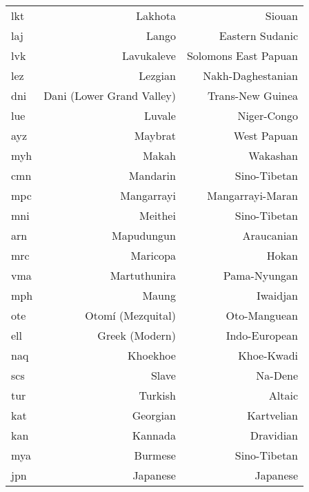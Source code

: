 \begin{longtable}{|l|r|r|}
lkt                & Lakhota                   & Siouan               \\
laj                & Lango                     & Eastern Sudanic      \\
lvk                & Lavukaleve                & Solomons East Papuan \\
lez                & Lezgian                   & Nakh-Daghestanian    \\
dni                & Dani (Lower Grand Valley) & Trans-New Guinea     \\
lue                & Luvale                    & Niger-Congo          \\
ayz                & Maybrat                   & West Papuan          \\
myh                & Makah                     & Wakashan             \\
cmn                & Mandarin                  & Sino-Tibetan         \\
mpc                & Mangarrayi                & Mangarrayi-Maran     \\
mni                & Meithei                   & Sino-Tibetan         \\
arn                & Mapudungun                & Araucanian           \\
mrc                & Maricopa                  & Hokan                \\
vma                & Martuthunira              & Pama-Nyungan         \\
mph                & Maung                     & Iwaidjan             \\
ote                & Otomí (Mezquital)         & Oto-Manguean         \\
ell                & Greek (Modern)            & Indo-European        \\
naq                & Khoekhoe                  & Khoe-Kwadi           \\
scs                & Slave                     & Na-Dene              \\
tur                & Turkish                   & Altaic               \\
kat                & Georgian                  & Kartvelian           \\
kan                & Kannada                   & Dravidian            \\
mya                & Burmese                   & Sino-Tibetan         \\
jpn                & Japanese                  & Japanese             \\

\end{longtable}
